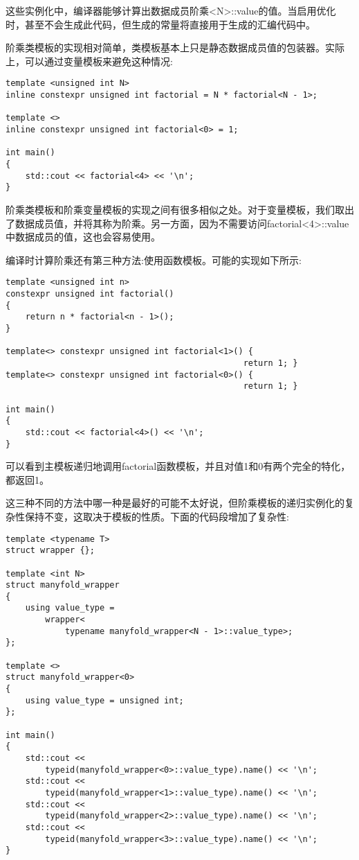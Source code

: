 这些实例化中，编译器能够计算出数据成员阶乘<N>::value的值。当启用优化时，甚至不会生成此代码，但生成的常量将直接用于生成的汇编代码中。

阶乘类模板的实现相对简单，类模板基本上只是静态数据成员值的包装器。实际上，可以通过变量模板来避免这种情况:

\begin{lstlisting}[style=styleCXX]
template <unsigned int N>
inline constexpr unsigned int factorial = N * factorial<N - 1>;

template <>
inline constexpr unsigned int factorial<0> = 1;

int main()
{
	std::cout << factorial<4> << '\n';
}
\end{lstlisting}

阶乘类模板和阶乘变量模板的实现之间有很多相似之处。对于变量模板，我们取出了数据成员值，并将其称为阶乘。另一方面，因为不需要访问factorial<4>::value中数据成员的值，这也会容易使用。

编译时计算阶乘还有第三种方法:使用函数模板。可能的实现如下所示:

\begin{lstlisting}[style=styleCXX]
template <unsigned int n>
constexpr unsigned int factorial()
{
	return n * factorial<n - 1>();
}

template<> constexpr unsigned int factorial<1>() {
												return 1; }
template<> constexpr unsigned int factorial<0>() {
												return 1; }

int main()
{
	std::cout << factorial<4>() << '\n';
}
\end{lstlisting}

可以看到主模板递归地调用factorial函数模板，并且对值1和0有两个完全的特化，都返回1。

这三种不同的方法中哪一种是最好的可能不太好说，但阶乘模板的递归实例化的复杂性保持不变，这取决于模板的性质。下面的代码段增加了复杂性:

\begin{lstlisting}[style=styleCXX]
template <typename T>
struct wrapper {};

template <int N>
struct manyfold_wrapper
{
	using value_type =
		wrapper<
			typename manyfold_wrapper<N - 1>::value_type>;
};

template <>
struct manyfold_wrapper<0>
{
	using value_type = unsigned int;
};

int main()
{
	std::cout <<
		typeid(manyfold_wrapper<0>::value_type).name() << '\n';
	std::cout <<
		typeid(manyfold_wrapper<1>::value_type).name() << '\n';
	std::cout <<
		typeid(manyfold_wrapper<2>::value_type).name() << '\n';
	std::cout <<
		typeid(manyfold_wrapper<3>::value_type).name() << '\n';
}
\end{lstlisting}

